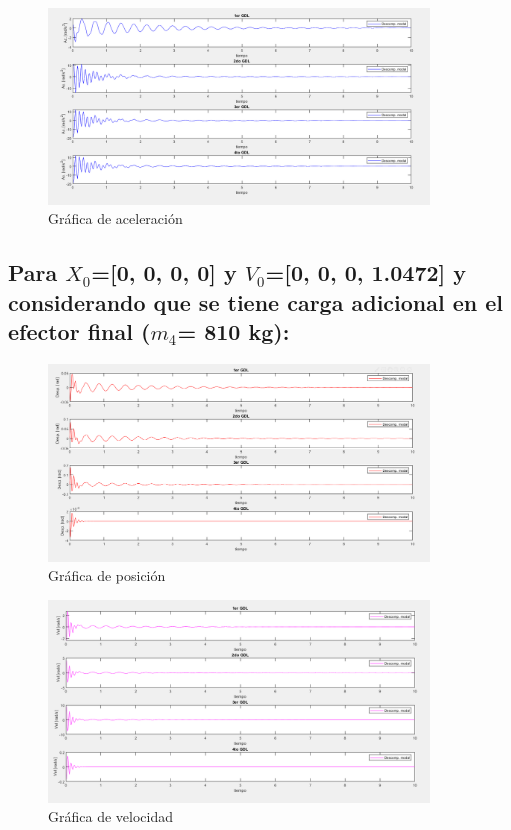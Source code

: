\documentclass{aleph-revista}
\begin{document}
\begin{figure}[H]
    \centering
    \includegraphics[width=0.90\textwidth]{Imagenes/r24.png}
    \caption{Gráfica de aceleración}
    \label{fig:etiqueta de la figura}
\end{figure}


\subsection{Para $X_0$=[0, 0, 0, 0] y $V_0$=[0, 0, 0, 1.0472] y considerando que se tiene carga adicional en el efector final ($m_4$= 810 kg):}
\begin{figure}[H]
    \centering
    \includegraphics[width=0.90\textwidth]{Imagenes/r25.png}
    \caption{Gráfica de posición}
    \label{fig:etiqueta de la figura}
\end{figure}

\begin{figure}[H]
    \centering
    \includegraphics[width=0.90\textwidth]{Imagenes/r26.png}
    \caption{Gráfica de velocidad}
    \label{fig:etiqueta de la figura}
\end{figure}
\end{document}

